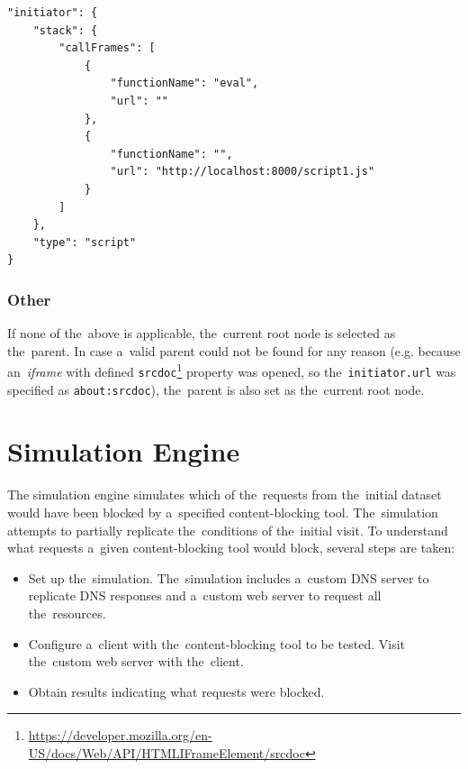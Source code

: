 \setcounter{listing}{2}
\begin{listing}[!ht]
    \begin{verbatim}
"initiator": {
    "stack": {
        "callFrames": [
            {
                "functionName": "eval",
                "url": ""
            },
            {
                "functionName": "",
                "url": "http://localhost:8000/script1.js"
            }
        ]
    },
    "type": "script"
}
    \end{verbatim}
    \caption{Example of empty \texttt{url} attribute in the~call stack caused by the~use of \texttt{eval}, which was called by \emph{script1.js}, but the~empty \texttt{url} attribute of the~record does not reflect it. The~first record in the~list of call frames represents the~final call. This~presented call stack is edited and does not contain all logged attributes.}
    \label{empty_url_init}
\end{listing}

\subsubsection{Other}
If none of the~above is applicable, the~current root node is selected as the~parent. In case a~valid parent could not be found for any reason (e.g. because an~\textit{iframe} with defined \texttt{srcdoc}\footnote{\url{https://developer.mozilla.org/en-US/docs/Web/API/HTMLIFrameElement/srcdoc}} property was opened, so the~\texttt{initiator.url} was specified as \texttt{about:srcdoc}), the~parent is also set as the~current root node.


\section{Simulation Engine}
The simulation engine simulates which of the~requests from the~initial dataset would have been blocked by a~specified content-blocking tool. The~simulation attempts to partially replicate the~conditions of the~initial visit. To understand what requests a~given content-blocking tool would block, several steps are taken:

\begin{itemize}
\setlength\itemsep{0em}

\item Set up the~simulation. The~simulation includes a~custom DNS server to replicate DNS responses and a~custom web server to request all the~resources.
\item Configure a~client with the~content-blocking tool to be tested. Visit the~custom web server with the~client. 
\item Obtain results indicating what requests were blocked.

\end{itemize}

